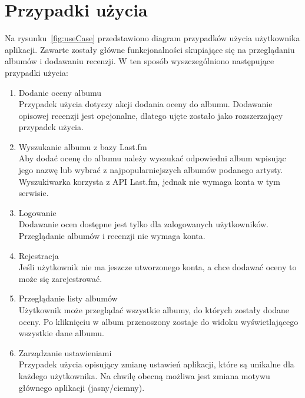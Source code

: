 \section{Przypadki użycia}
	Na rysunku~\ref{fig:useCase} przedstawiono diagram przypadków użycia użytkownika aplikacji.
	Zawarte zostały główne funkcjonalności skupiające się na przeglądaniu albumów i dodawaniu recenzji.
	W ten sposób wyszczególniono następujące przypadki użycia:
	\begin{enumerate}
		\item Dodanie oceny albumu\\
			Przypadek użycia dotyczy akcji dodania oceny do albumu.
			Dodawanie opisowej recenzji jest opcjonalne, dlatego ujęte zostało jako rozszerzający przypadek użycia.

		\item Wyszukanie albumu z bazy Last.fm\\
			Aby dodać ocenę do albumu należy wyszukać odpowiedni album wpisując jego nazwę lub wybrać z najpopularniejszych albumów podanego artysty.
			Wyszukiwarka korzysta z API Last.fm, jednak nie wymaga konta w tym serwisie.

		\item Logowanie\\
			Dodawanie ocen dostępne jest tylko dla zalogowanych użytkowników.
			Przeglądanie albumów i recenzji nie wymaga konta.
		
		\item Rejestracja\\
			Jeśli użytkownik nie ma jeszcze utworzonego konta, a chce dodawać oceny to może się zarejestrować.

		\item Przeglądanie listy albumów\\
			Użytkownik może przeglądać wszystkie albumy, do których zostały dodane oceny.
			Po kliknięciu w album przenoszony zostaje do widoku wyświetlającego wszystkie dane albumu.

		\item Zarządzanie ustawieniami\\
			Przypadek użycia opisujący zmianę ustawień aplikacji, które są unikalne dla każdego użytkownika.
			Na chwilę obecną możliwa jest zmiana motywu głównego aplikacji (jasny/ciemny).

	\end{enumerate}
	
